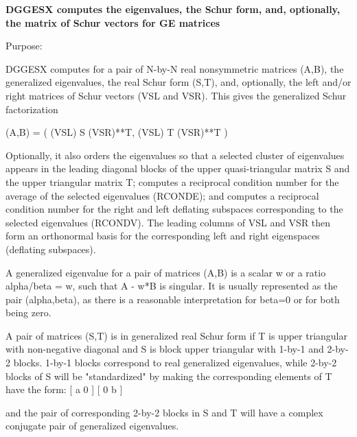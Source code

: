 {\bfseries  D\+G\+G\+E\+S\+X computes the eigenvalues, the Schur form, and, optionally, the matrix of Schur vectors for G\+E matrices} 

 \begin{DoxyParagraph}{Purpose\+: }
\begin{DoxyVerb} DGGESX computes for a pair of N-by-N real nonsymmetric matrices
 (A,B), the generalized eigenvalues, the real Schur form (S,T), and,
 optionally, the left and/or right matrices of Schur vectors (VSL and
 VSR).  This gives the generalized Schur factorization

      (A,B) = ( (VSL) S (VSR)**T, (VSL) T (VSR)**T )

 Optionally, it also orders the eigenvalues so that a selected cluster
 of eigenvalues appears in the leading diagonal blocks of the upper
 quasi-triangular matrix S and the upper triangular matrix T; computes
 a reciprocal condition number for the average of the selected
 eigenvalues (RCONDE); and computes a reciprocal condition number for
 the right and left deflating subspaces corresponding to the selected
 eigenvalues (RCONDV). The leading columns of VSL and VSR then form
 an orthonormal basis for the corresponding left and right eigenspaces
 (deflating subspaces).

 A generalized eigenvalue for a pair of matrices (A,B) is a scalar w
 or a ratio alpha/beta = w, such that  A - w*B is singular.  It is
 usually represented as the pair (alpha,beta), as there is a
 reasonable interpretation for beta=0 or for both being zero.

 A pair of matrices (S,T) is in generalized real Schur form if T is
 upper triangular with non-negative diagonal and S is block upper
 triangular with 1-by-1 and 2-by-2 blocks.  1-by-1 blocks correspond
 to real generalized eigenvalues, while 2-by-2 blocks of S will be
 "standardized" by making the corresponding elements of T have the
 form:
         [  a  0  ]
         [  0  b  ]

 and the pair of corresponding 2-by-2 blocks in S and T will have a
 complex conjugate pair of generalized eigenvalues.\end{DoxyVerb}
 
\end{DoxyParagraph}

